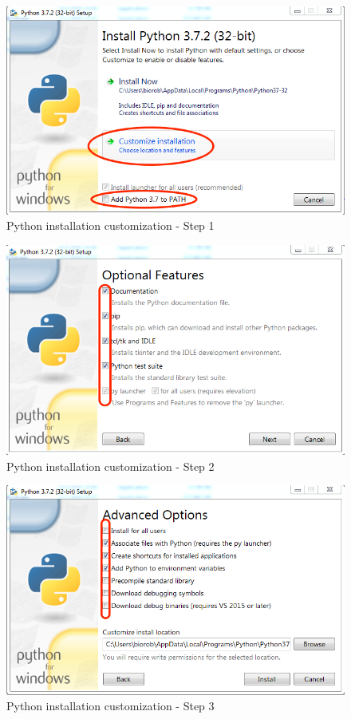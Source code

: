 \documentclass{cmc}
\begin{document}
\begin{figure}[H]
  \centering
  \includegraphics[width=\textwidth]{figures/python_install_1}
  \caption{Python installation customization - Step 1}
  \label{fig:win-py-step1}
\end{figure}

\begin{figure}[H]
  \centering
  \includegraphics[width=\textwidth]{figures/python_install_2}
  \caption{Python installation customization - Step 2}
  \label{fig:win-py-step2}
\end{figure}

\begin{figure}[H]
  \centering
  \includegraphics[width=\textwidth]{figures/python_install_3}
  \caption{Python installation customization - Step 3}
  \label{fig:win-py-step3}
\end{figure}
\end{document}
